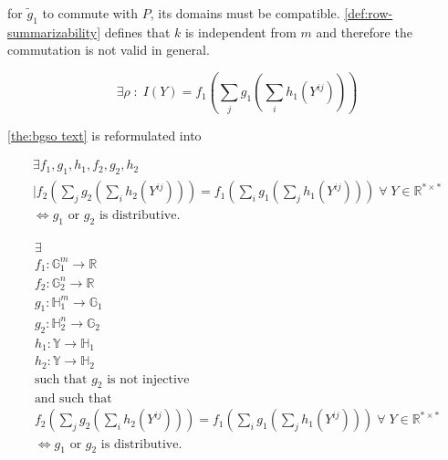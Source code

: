 \documentclass[sn-mathphys-num]{sn-jnl}%
\theoremstyle{thmstyleone}%
\theoremstyle{thmstyletwo}%
\theoremstyle{thmstylethree}%
\begin{document}
\begin{appendices}
for $\tilde g_1$ to commute with $P$, its domains must be compatible. \autoref{def:row-summarizability} defines that $k$ is independent from $m$ and therefore the commutation is not valid in general.

\begin{equation}
    \exists \rho \;\colon\; 
    I(Y) = f_1 \left( \sum_j g_1\left( \sum_i h_1(Y^{ij}) \right) \right)
\end{equation}

\autoref{the:bgso text} is reformulated into

\begin{multline}
    \exists f_1, g_1, h_1, f_2, g_2, h_2
    \\
    \mid
    f_2 \left( \sum_j g_2\left( \sum_i h_2(Y^{ij}) \right) \right)
    = f_1 \left( \sum_i g_1\left( \sum_j h_1(Y^{ij}) \right) \right)
    \;\forall \; Y \in \mathbb{R}^{*\times *}
    \\
    \iff g_1 \text{ or } g_2 \text{ is distributive.}
\end{multline}

\begin{multline}
    \exists\\
    f_1:\mathbb{G}_1^m \to \mathbb{R} \\
    f_2:\mathbb{G}_2^n \to \mathbb{R} \\
    g_1:\mathbb{H}_1^m \to \mathbb{G}_1 \\
    g_2:\mathbb{H}_2^n \to \mathbb{G}_2 \\
    h_1:\mathbb{Y} \to \mathbb{H}_1 \\
    h_2:\mathbb{Y} \to \mathbb{H}_2
    \\
    \text{such that } g_2 \text{ is not injective}
    \\
    \text{and such that}
    \\
    f_2 \left( \sum_j g_2\left( \sum_i h_2(Y^{ij}) \right) \right)
    = f_1 \left( \sum_i g_1\left( \sum_j h_1(Y^{ij}) \right) \right)
    \;\forall \; Y \in \mathbb{R}^{*\times *}
    \\
    \iff g_1 \text{ or } g_2 \text{ is distributive.}
\end{multline}



\end{appendices}
\end{document}
